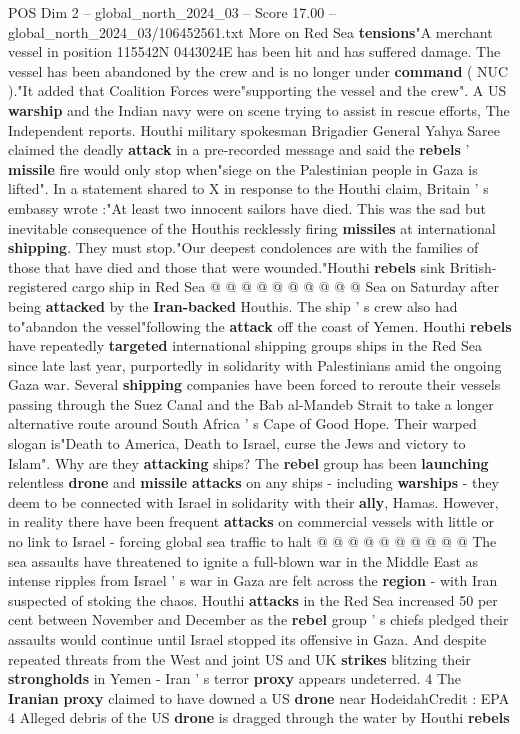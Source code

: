 \begin{textsample}{POS Dim 2 – global\_north\_2024\_03 – Score 17.00 – global\_north\_2024\_03/106452561.txt}  \label{ex:f2_pos_369}
More on Red Sea \textbf{tensions}"A merchant vessel in position 115542N 0443024E has been hit and has suffered damage.
The vessel has been abandoned by the crew and is no longer under \textbf{command} ( NUC )."It added that Coalition Forces were"supporting the vessel and the crew".
A US \textbf{warship} and the Indian navy were on scene trying to assist in rescue efforts, The Independent reports.
Houthi military spokesman Brigadier General Yahya Saree claimed the deadly \textbf{attack} in a pre-recorded message and said the \textbf{rebels} ' \textbf{missile} fire would only stop when"siege on the Palestinian people in Gaza is lifted".
In a statement shared to X in response to the Houthi claim, Britain ' s embassy wrote :"At least two innocent sailors have died.
This was the sad but inevitable consequence of the Houthis recklessly firing \textbf{missiles} at international \textbf{shipping}.
They must stop."Our deepest condolences are with the families of those that have died and those that were wounded."Houthi \textbf{rebels} sink British-registered cargo ship in Red Sea @ @ @ @ @ @ @ @ @ @ Sea on Saturday after being \textbf{attacked} by the \textbf{Iran-backed} Houthis.
The ship ' s crew also had to"abandon the vessel"following the \textbf{attack} off the coast of Yemen.
Houthi \textbf{rebels} have repeatedly \textbf{targeted} international shipping groups ships in the Red Sea since late last year, purportedly in solidarity with Palestinians amid the ongoing Gaza war.
Several \textbf{shipping} companies have been forced to reroute their vessels passing through the Suez Canal and the Bab al-Mandeb Strait to take a longer alternative route around South Africa ' s Cape of Good Hope.
Their warped slogan is"Death to America, Death to Israel, curse the Jews and victory to Islam".
Why are they \textbf{attacking} ships?
The \textbf{rebel} group has been \textbf{launching} relentless \textbf{drone} and \textbf{missile} \textbf{attacks} on any ships - including \textbf{warships} - they deem to be connected with Israel in solidarity with their \textbf{ally}, Hamas.
However, in reality there have been frequent \textbf{attacks} on commercial vessels with little or no link to Israel - forcing global sea traffic to halt @ @ @ @ @ @ @ @ @ @ The sea assaults have threatened to ignite a full-blown war in the Middle East as intense ripples from Israel ' s war in Gaza are felt across the \textbf{region} - with Iran suspected of stoking the chaos.
Houthi \textbf{attacks} in the Red Sea increased 50 per cent between November and December as the \textbf{rebel} group ' s chiefs pledged their assaults would continue until Israel stopped its offensive in Gaza.
And despite repeated threats from the West and joint US and UK \textbf{strikes} blitzing their \textbf{strongholds} in Yemen - Iran ' s terror \textbf{proxy} appears undeterred. 4 The \textbf{Iranian} \textbf{proxy} claimed to have downed a US \textbf{drone} near HodeidahCredit : EPA 4 Alleged debris of the US \textbf{drone} is dragged through the water by Houthi \textbf{rebels}


\end{textsample}
